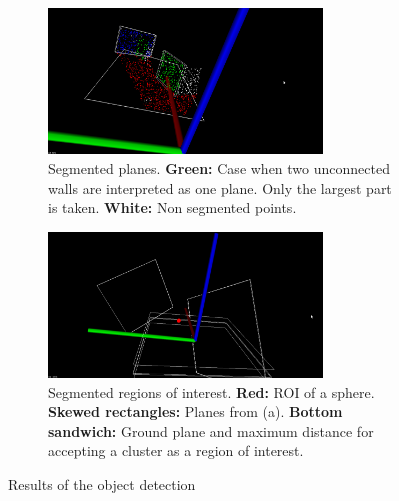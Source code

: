 \begin{figure}
\centering
\begin{subfigure}[b]{1.0\textwidth}
\centering
\includegraphics[width=0.8\textwidth]{figures/vision_planes.png}
\caption{Segmented planes. \textbf{Green:} Case when two unconnected walls are interpreted as one plane. Only the largest part is taken. \textbf{White:} Non segmented points.}
\label{fig:vision:seg_planes}
\vspace{10pt}
\end{subfigure}
\begin{subfigure}[b]{1.0\textwidth}
\includegraphics[width=0.8\textwidth]{figures/vision_roi_ball.png}
\centering
\caption{Segmented regions of interest. \textbf{Red:} ROI of a sphere. \textbf{Skewed rectangles:} Planes from (a). \textbf{Bottom sandwich:} Ground plane and maximum distance for accepting a cluster as a region of interest.}
\label{fig:vision:seg_rois}
\end{subfigure}
\caption{Results of the object detection}

\end{figure}

